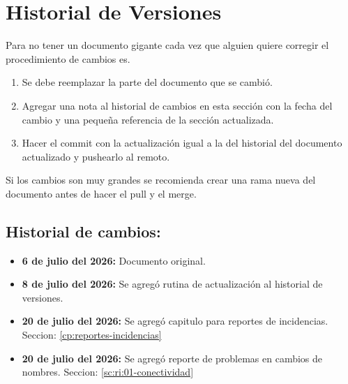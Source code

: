 \thispagestyle{plain}
\chapter[Historial de Versiones]{Historial de Versiones}
\label{cp:historialVersiones}

Para no tener un documento gigante cada vez que alguien quiere corregir el procedimiento de cambios es.
\begin{enumerate}
    \item Se debe reemplazar la parte del documento que se cambió.
    \item Agregar una nota al historial de cambios en esta sección con la fecha del cambio y una pequeña referencia de la sección actualizada.
    \item Hacer el commit con la actualización igual a la del historial del documento actualizado y pushearlo al remoto.
\end{enumerate}
Si los cambios son muy grandes se recomienda crear una rama nueva del documento antes de hacer el pull y el merge.

\section{Historial de cambios:}
\begin{itemize}
    \item \textbf{ 6 de julio del 2026:} Documento original. 
    \item \textbf{ 8 de julio del 2026:} Se agregó rutina de actualización al historial de versiones.
    \item \textbf{ 20 de julio del 2026:} Se agregó capitulo para reportes de incidencias. Seccion: \ref{cp:reportes-incidencias}
    \item \textbf{ 20 de julio del 2026:} Se agregó reporte de problemas en cambios de nombres. Seccion: \ref{sc:ri:01-conectividad}
\end{itemize}